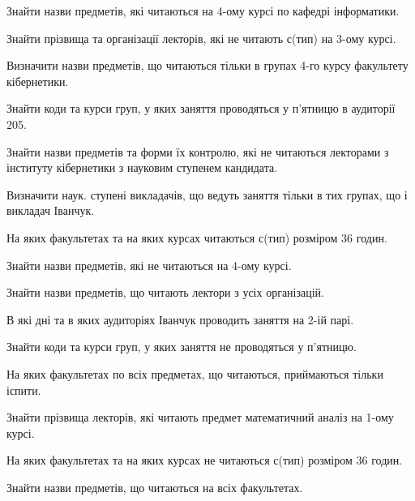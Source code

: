 \begin{card}
    \item Знайти назви предметів, які читаються на 4-ому курсі по кафедрі інформатики.
    \item Знайти прізвища та організації лекторів, які не читають с (тип) на 3-ому курсі.
    \item Визначити назви предметів, що читаються тільки в групах 4-го курсу факультету кібернетики.
\end{card}

\begin{card}
    \item Знайти коди та курси груп, у яких заняття проводяться у п'ятницю в аудиторії 205.
    \item Знайти назви предметів та форми їх контролю, які не читаються лекторами з інституту кібернетики з науковим ступенем кандидата.
    \item Визначити наук. ступені викладачів, що ведуть заняття тільки в тих групах, що і викладач Іванчук.
\end{card}

\begin{card}
    \item На яких факультетах  та на яких курсах читаються с (тип) розміром 36 годин.
    \item Знайти назви предметів, які не читаються на 4-ому курсі.
    \item Знайти назви предметів, що читають лектори з усіх організацій.
\end{card}

\begin{card}
    \item В які дні та в яких аудиторіях Іванчук проводить заняття на 2-ій парі.
    \item Знайти коди та курси груп, у яких заняття не проводяться у п'ятницю.
    \item На яких факультетах по всіх предметах, що читаються, приймаються тільки іспити.  
\end{card}

\begin{card}
    \item Знайти прізвища лекторів, які читають предмет математичний аналіз на 1-ому курсі.
    \item На яких факультетах  та на яких курсах не читаються с (тип) розміром 36 годин.
    \item Знайти назви предметів, що читаються на всіх факультетах.
\end{card}

